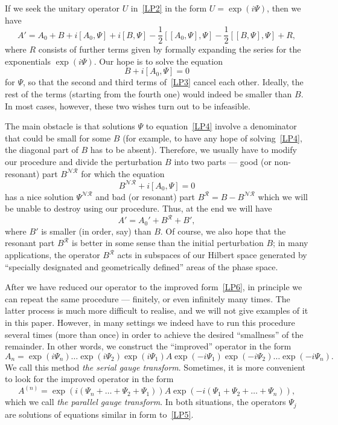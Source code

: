 \documentclass[10pt]{amsart}
\theoremstyle{definition}\newtheorem{defi}[theo]{Definition}\newtheorem{rema}[theo]{Remark}\newtheorem{exam}[theo]{Example}\newtheorem{nota}[theo]{Notation}
\newcommand{\CN}{\mathcal{N}}
\newcommand{\CR}{\mathcal{R}}
\newcommand{\CNR}{{\CN\!\CR}}
\begin{document}
If we seek the unitary operator $U$ in~\eqref{LP2} in the form $U=\exp(i \Psi)$, then we have
\begin{equation}\label{LP3}
A' = A_0 + B+i [A_0,\Psi] + i[B,\Psi]-\frac12 [[A_0,\Psi],\Psi]-\frac12 [[B,\Psi],\Psi]+R,
\end{equation}
where $R$ consists of further terms given by formally expanding the series for the exponentials $\exp(i\Psi)$. Our hope is to solve the equation
\begin{equation}\label{LP4}
B + i[A_0,\Psi]=0
\end{equation}
for $\Psi$, so that the second and third terms of~\eqref{LP3} cancel each other. Ideally, the rest of the terms (starting from the fourth one) would indeed be smaller than $B$. In most cases, however, these two wishes turn out to be infeasible.

The main obstacle is that solutions $\Psi$ to equation~\eqref{LP4} involve a denominator that could be small for some $B$ (for example, to have any hope of solving~\eqref{LP4}, the diagonal part of $B$ has to be absent). Therefore, we usually have to modify our procedure and divide the perturbation $B$ into two parts --- good (or non-resonant) part $B^{\CNR}$ for which the equation
\begin{equation}\label{LP5}
B^{\CNR} + i[A_0,\Psi]=0
\end{equation}
has a nice solution $\Psi^{\CNR}$ and bad (or resonant) part $B^{\CR}=B-B^{\CNR}$ which we will be unable to destroy using our procedure. Thus, at the end we will have
\begin{equation}\label{LP6}
A' = A_0' + B^{\CR}+B',
\end{equation}
where $B'$ is smaller (in order, say) than $B$. Of course, we also hope that the resonant part $B^{\CR}$ is better in some sense than the initial perturbation $B$; in many applications, the operator $B^{\CR}$ acts in subspaces of our Hilbert space generated by ``specially designated and geometrically defined'' areas of the phase space.


After we have reduced our operator to the improved form~\eqref{LP6}, in principle we can repeat the same procedure --- finitely, or even infinitely many times. The latter process is much more difficult to realise, and we will not give examples of it in this paper. However, in many settings we indeed have to run this procedure several times (more than once) in order to achieve the desired ``smallness'' of the remainder. In other words, we construct the ``improved'' operator in the form
\begin{equation}\label{LP7}
A_n = \exp(i \Psi_n)\dots\exp(i \Psi_2)\exp(i \Psi_1)A\exp(-i \Psi_1)\exp(-i \Psi_2)\dots\exp(-i \Psi_n).
\end{equation}
We call this method {\emph {the serial gauge transform}}. Sometimes, it is more convenient to look for the improved operator in the form
\begin{equation}\label{LP8}
A^{(n)} = \exp(i (\Psi_n+\dotso+ \Psi_2+\Psi_1))A\exp(-i (\Psi_1+\Psi_2+\dotso +\Psi_n)),
\end{equation}
which we call {\emph {the parallel gauge transform}}. In both situations, the operators $\Psi_j$ are solutions of equations similar in form to~\eqref{LP5}.
\end{document}
